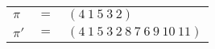 \begin{example}\label{example:ZMGTJRFE}
  \hfill
  \begin{\position}
    \begin{tabular}{lll}
      $\pi$  & $=$ & $(4~1~5~3~2)$ \\
      $\pi'$ & $=$ & $(4~1~5~3~2~8~7~6~9~10~11)$ \\
    \end{tabular}
  \end{\position}
\end{example}